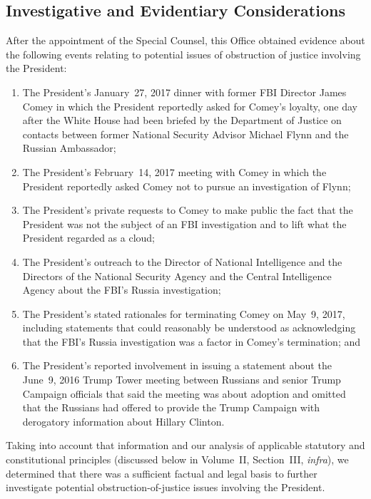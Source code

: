 \subsection{Investigative and Evidentiary Considerations}

After the appointment of the Special Counsel, this Office obtained evidence about the following events relating to potential issues of obstruction of justice involving the President:

\renewcommand{\labelenumi}{(\alph{enumi})}
\begin{enumerate}
    \item The President’s January~27, 2017 dinner with former FBI Director James Comey in which the President reportedly asked for Comey’s loyalty, one day after the White House had been briefed by the Department of Justice on contacts between former National Security Advisor Michael Flynn and the Russian Ambassador;

    \item The President’s February~14, 2017 meeting with Comey in which the President reportedly asked Comey not to pursue an investigation of Flynn;

    \item The President’s private requests to Comey to make public the fact that the President was not the subject of an FBI investigation and to lift what the President regarded as a cloud;

    \item The President’s outreach to the Director of National Intelligence and the Directors of the National Security Agency and the Central Intelligence Agency about the FBI’s Russia investigation;

    \item The President’s stated rationales for terminating Comey on May~9, 2017, including statements that could reasonably be understood as acknowledging that the FBI’s Russia investigation was a factor in Comey’s termination; and

    \item The President’s reported involvement in issuing a statement about the June~9, 2016 Trump Tower meeting between Russians and senior Trump Campaign officials that said the meeting was about adoption and omitted that the Russians had offered to provide the Trump Campaign with derogatory information about Hillary Clinton.
\end{enumerate}

Taking into account that information and our analysis of applicable statutory and constitutional principles (discussed below in Volume~II, Section~III, \textit{infra}), we determined that there was a sufficient factual and legal basis to further investigate potential obstruction-of-justice issues involving the President.

